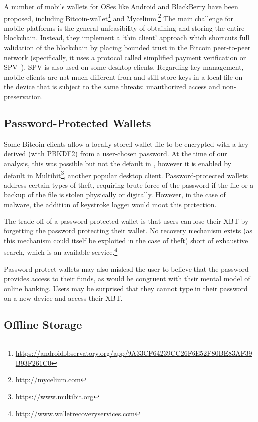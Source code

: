 A number of mobile wallets for OSes like Android and BlackBerry have been proposed, including Bitcoin-wallet\footnote{\url{https://androidobservatory.org/app/9A33CF64239CC26F6E52F80BE83AF39B93F261C0}} and Mycelium.\footnote{\url{http://mycelium.com}} The main challenge for mobile platforms is the general unfeasibility of obtaining and storing the entire blockchain. Instead, they implement a `thin client' approach which shortcuts full validation of the blockchain by placing bounded trust in the Bitcoin peer-to-peer network (specifically, it uses a protocol called simplified payment verification or SPV~\cite{Nak08}). SPV is also used on some desktop clients. Regarding key management, mobile clients are not much different from \bitcoinclient and still store keys in a local file on the device that is subject to the same threats: unauthorized access and non-preservation.

\subsection{Password-Protected Wallets}

Some Bitcoin clients allow a locally stored wallet file to be encrypted with a key derived (\eg with PBKDF2) from a user-chosen password. At the time of our analysis, this was possible but not the default in \bitcoinclient, however it is enabled by default in Multibit\footnote{\url{https://www.multibit.org}}, another popular desktop client. Password-protected wallets address certain types of theft, requiring brute-force of the password if the file or a backup of the file is stolen physically or digitally. However, in the case of malware, the addition of keystroke logger would moot this protection.

The trade-off of a password-protected wallet is that users can lose their XBT by forgetting the password protecting their wallet. No recovery mechanism exists (as this mechanism could itself be exploited in the case of theft) short of exhaustive search, which is an available service.\footnote{\url{http://www.walletrecoveryservices.com}}

Password-protect wallets may also mislead the user to believe that the password provides access to their funds, as would be congruent with their mental model of online banking. Users may be surprised that they cannot type in their password on a new device and access their XBT. 

\subsection{Offline Storage}
\label{sec:offline storage}

